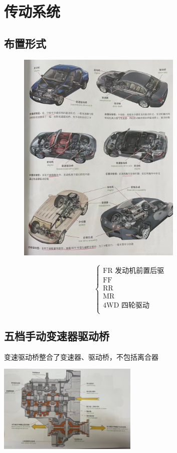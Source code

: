\section{传动系统}
\subsection{布置形式}
	\begin{figure}
		\includegraphics[width=0.7\textwidth]{3-6}
	\end{figure}
	\begin{equation*}
		\begin{cases}
			\text{FR 发动机前置后驱} \\
			\text{FF} \\
			\text{RR} \\
			\text{MR} \\
			\text{4WD 四轮驱动} \\
		\end{cases}
	\end{equation*}
\clearpage
	\subsection{五档手动变速器驱动桥}
		变速驱动桥整合了变速器、驱动桥，不包括离合器
		\begin{center}
		\includegraphics[width=0.5\textwidth]{3-12}
		\end{center}
